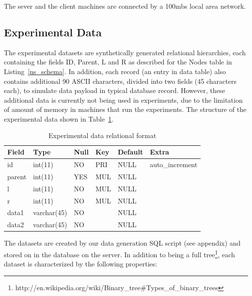 The sever and the client machines are connected by a 100mbs local area network.

\subsection{Experimental Data}\label{sec_experimental_data}

The experimental datasets are synthetically generated relational hierarchies, each containing the fields ID, Parent, L and R as described for the Nodes table in Listing~\ref{ns_schema}. In addition, each record (an entry in data table) also contains additional 90 ASCII characters, divided into two fields (45 characters each), to simulate data payload in typical database record. However, these additional data is currently not being used in experiments, due to the limitation of amount of memory in machines that run the experiments. The structure of the experimental data shown in Table~\ref{tb_rel_exp_data_format}.

\begin{table}[h]
\centering
\begin{tabular}{|l|l|l|l|l|l|}
\hline
\textbf{Field} & \textbf{Type} & \textbf{Null} & \textbf{Key} & \textbf{Default} & \textbf{Extra}  \\ \hline
id             & int(11)       & NO            & PRI          & NULL             & auto\_increment \\ \hline
parent         & int(11)       & YES           & MUL          & NULL             &                 \\ \hline
l              & int(11)       & NO            & MUL          & NULL             &                 \\ \hline
r              & int(11)       & NO            & MUL          & NULL             &                 \\ \hline
data1          & varchar(45)   & NO            &              & NULL             &                 \\ \hline
data2          & varchar(45)   & NO            &              & NULL             &                 \\ \hline
\end{tabular}
\caption{Experimental data relational format}
\label{tb_rel_exp_data_format}
\end{table}

The datasets are created by our data generation SQL script (see appendix) and stored on in the database on the server. In addition to being a full tree\footnote{http://en.wikipedia.org/wiki/Binary\_tree\#Types\_of\_binary\_trees}, each dataset is characterized by the following properties:

